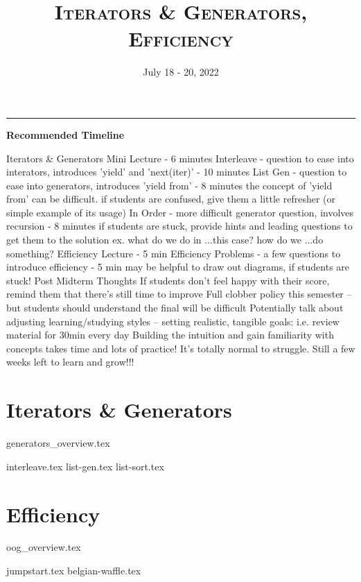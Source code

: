 \documentclass{exam}
\title{\textsc{Iterators \& Generators, Efficiency}}
\date{July 18 - 20, 2022}
\begin{document}
\maketitle
\rule{\textwidth}{0.15em}
\fontsize{12}{15}\selectfont


\begin{guide}
    \textbf{Recommended Timeline}
    \begin{outline}[enumerate]
        \1 Iterators \& Generators Mini Lecture - 6 minutes
        \1 Interleave - question to ease into interators, introduces 'yield' and 'next(iter)' - 10 minutes
        \1 List Gen - question to ease into generators, introduces 'yield from' - 8 minutes
        \2 the concept of 'yield from' can be difficult. if students are confused, give them a little refresher (or simple example of its usage)
        \1 In Order - more difficult generator question, involves recursion - 8 minutes
        \2 if students are stuck, provide hints and leading questions to get them to the solution
        \2 ex. what do we do in ...this case? how do we ...do something?  
        \1 Efficiency Lecture - 5 min
        \1 Efficiency Problems - a few questions to introduce efficiency - 5 min
        \2 may be helpful to draw out diagrams, if students are stuck!
        \1 Post Midterm Thoughts
        \2 If students don't feel happy with their score, remind them that there's still time to improve
        \2 Full clobber policy this semester -- but students should understand the final will be difficult
        \2 Potentially talk about adjusting learning/studying styles -- setting realistic, tangible goals: i.e. review material for 30min every day
        \2 Building the intuition and gain familiarity with concepts takes time and lots of practice! It's totally normal to struggle. Still a few weeks left to learn and grow!!!
    \end{outline}
\end{guide}

\section{Iterators \& Generators}
{generators_overview.tex}
\begin{questions}
{interleave.tex}
\newpage
{list-gen.tex}
\newpage
{list-sort.tex}
\end{questions}

\newpage
\section{Efficiency}
{oog_overview.tex}
\newpage
\begin{questions}
{jumpstart.tex}
{belgian-waffle.tex}
\end{questions}
\end{document}
